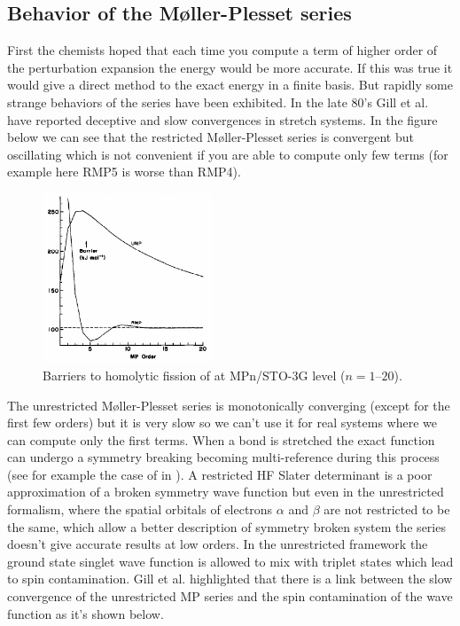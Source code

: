 \documentclass[11pt,a4paper]{article}
\begin{document}
\subsection{Behavior of the M{\o}ller-Plesset series}

First the chemists hoped that each time you compute a term of higher order of the perturbation expansion the energy would be more accurate. If this was true it would give a direct method to the exact energy in a finite basis. But rapidly some strange behaviors of the series have been exhibited. In the late 80's Gill et al. have reported deceptive and slow convergences in stretch systems\cite{Gill_1986, Gill_1998, Handy_1985,Leininger_2000}. In the figure below we can see that the restricted M{\o}ller-Plesset series is convergent but oscillating which is not convenient if you are able to compute only few terms (for example here RMP5 is worse than RMP4). 

\begin{figure}[h!]
    \centering
    \includegraphics[width=0.45\textwidth]{gill1986.png}
    \caption{\centering Barriers to homolytic fission of  at MPn/STO-3G level ($n = 1$--$20$).}
    \label{fig:my_label}
\end{figure}

The unrestricted M{\o}ller-Plesset series is monotonically converging (except for the first few orders) but it is very slow so we can't use it for real systems where we can compute only the first terms. When a bond is stretched the exact function can undergo a symmetry breaking becoming multi-reference during this process (see for example the case of  in \cite{SzaboBook}). A restricted HF Slater determinant is a poor approximation of a broken symmetry wave function but even in the unrestricted formalism, where the spatial orbitals of electrons $\alpha$ and $\beta$ are not restricted to be the same\cite{Fukutome_1981}, which allow a better description of symmetry broken system the series doesn't give accurate results at low orders. In the unrestricted framework the ground state singlet wave function is allowed to mix with triplet states which lead to spin contamination. Gill et al. highlighted that there is a link between the slow convergence of the unrestricted MP series and the spin contamination of the wave function as it's shown below.
\end{document}

